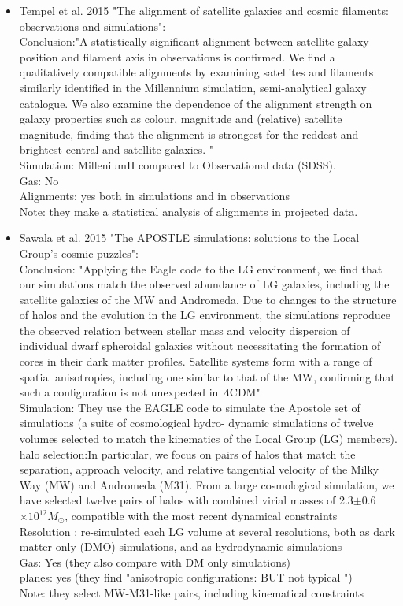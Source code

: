 \documentclass{emulateapj}
\begin{document}
\begin{itemize}
\item{Tempel et al. 2015 "The alignment of satellite galaxies and
cosmic filaments: observations and simulations":\\
Conclusion:"A statistically significant alignment between satellite
galaxy position and filament axis in observations is confirmed. We
find a qualitatively compatible alignments by examining satellites and
filaments similarly identified in the Millennium simulation,
semi-analytical galaxy catalogue. We also examine the dependence of
the alignment strength on galaxy properties such as colour, magnitude
and (relative) satellite magnitude, finding that the alignment is
strongest for the reddest and brightest central and satellite
galaxies. "\\ 
Simulation: MilleniumII compared to Observational data (SDSS).\\
Gas: No\\
Alignments: yes both in simulations and in observations\\
Note: they make a statistical analysis of alignments in projected
data.}

\item{Sawala et al. 2015 "The APOSTLE simulations: solutions to the
Local Group's cosmic puzzles":\\
Conclusion: "Applying the Eagle code to the LG environment, we find
that our simulations match the observed abundance of LG galaxies,
including the satellite galaxies of the MW and Andromeda. Due to
changes to the structure of halos and the evolution in the LG
environment, the simulations reproduce the observed relation between
stellar mass and velocity dispersion of individual dwarf spheroidal
galaxies without necessitating the formation of cores in their dark
matter profiles. Satellite systems form with a range of spatial
anisotropies, including one similar to that of the MW, confirming that
such a configuration is not unexpected in $\Lambda$CDM"\\ 
Simulation: They use the EAGLE code to simulate the Apostole set of
simulations (a suite of cosmological hydro-
dynamic simulations of twelve volumes selected to match the kinematics
of the Local Group (LG) members).\\
halo selection:In particular, we focus
on pairs of halos that match the separation, approach
velocity, and relative tangential velocity of the Milky Way
(MW) and Andromeda (M31). From a large cosmological
simulation, we have selected twelve pairs of halos with combined
virial masses of  2.3$\pm$0.6$\times 10^{12}M_\odot$, compatible
with the most recent dynamical constraints\\ 
Resolution : re-simulated each LG volume at several resolutions,
both as dark matter only (DMO) simulations, and
as hydrodynamic simulations\\
Gas: Yes (they also compare with DM only simulations)\\
planes: yes (they find "anisotropic configurations: BUT not typical ")\\
Note: they select MW-M31-like pairs, including kinematical
constraints\\}


\end{itemize}
\end{document}
